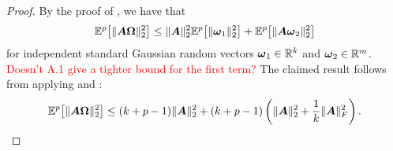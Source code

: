 \begin{proof}
    By the proof of \cite[Lemma B.1]{tropp-2023-randomized-algorithms}, we have that
    \begin{equation}
        \mathbb{E}^{p}\big[ \lVert \boldsymbol{A} \boldsymbol{\Omega} \rVert _2^2 \big]
        \leq \lVert \boldsymbol{A} \rVert _2^2 \mathbb{E}^{p}\big[ \lVert \boldsymbol{\omega}_1 \rVert _2^2 \big] + \mathbb{E}^{p}\big[ \lVert \boldsymbol{A} \boldsymbol{\omega}_2 \rVert _2^2 \big]
    \end{equation}
    for independent standard Gaussian random vectors $\boldsymbol{\omega}_1 \in \mathbb{R}^{k}$ and $\boldsymbol{\omega}_2 \in \mathbb{R}^{m}$. \textcolor{red}{Doesn't A.1 give a tighter bound for the first term?} The claimed result follows from applying  and :
    \[
        \mathbb{E}^{p}\big[ \lVert \boldsymbol{A} \boldsymbol{\Omega} \rVert _2^2 \big]
        \leq (k + p - 1) \lVert \boldsymbol{A} \rVert _2^2  + (k + p - 1) \left( \lVert \boldsymbol{A} \rVert _2^2 + \frac{1}{k} \lVert \boldsymbol{A} \rVert _F^2 \right).
    \]
\end{proof}


